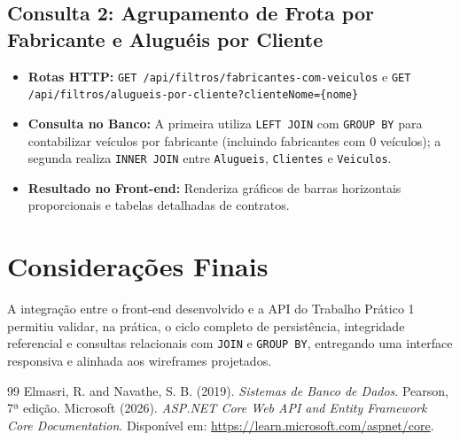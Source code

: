 \documentclass[12pt]{article}
\begin{document}
\subsection{Consulta 2: Agrupamento de Frota por Fabricante e Aluguéis por Cliente}
\begin{itemize}
  \item \textbf{Rotas HTTP:} \texttt{GET /api/filtros/fabricantes-com-veiculos} e \texttt{GET /api/filtros/alugueis-por-cliente?clienteNome=\{nome\}}
  \item \textbf{Consulta no Banco:} A primeira utiliza \texttt{LEFT JOIN} com \texttt{GROUP BY} para contabilizar veículos por fabricante (incluindo fabricantes com 0 veículos); a segunda realiza \texttt{INNER JOIN} entre \texttt{Alugueis}, \texttt{Clientes} e \texttt{Veiculos}.
  \item \textbf{Resultado no Front-end:} Renderiza gráficos de barras horizontais proporcionais e tabelas detalhadas de contratos.
\end{itemize}

\section{Considerações Finais}

A integração entre o front-end desenvolvido e a API do Trabalho Prático 1 permitiu validar, na prática, o ciclo completo de persistência, integridade referencial e consultas relacionais com \texttt{JOIN} e \texttt{GROUP BY}, entregando uma interface responsiva e alinhada aos wireframes projetados.

\begin{thebibliography}{99}
 Elmasri, R. and Navathe, S. B. (2019). \textit{Sistemas de Banco de Dados}. Pearson, 7ª edição.
 Microsoft (2026). \textit{ASP.NET Core Web API and Entity Framework Core Documentation}. Disponível em: \url{https://learn.microsoft.com/aspnet/core}.
\end{thebibliography}
\end{document}
